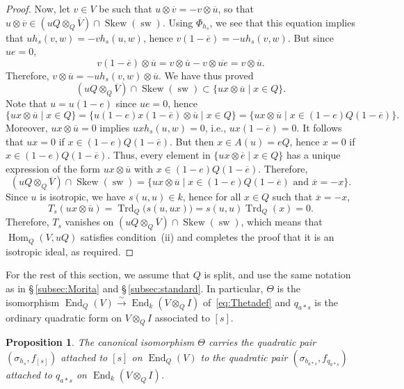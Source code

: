 \documentclass{amsart}
\DeclareMathOperator{\sw}{sw}
\DeclareMathOperator{\End}{End}
\DeclareMathOperator{\Hom}{Hom}
\DeclareMathOperator{\Trd}{Trd}
\DeclareMathOperator{\Skew}{Skew}
\newtheorem{prop}{Proposition}[section]
\theoremstyle{remark}
\begin{document}
\begin{proof}
Now, let $v\in V$ be such that $u\otimes\overline v=-v\otimes
\overline u$, so that $u\otimes \overline v\in (uQ\otimes_Q\overline V)\cap\Skew(\sw)$. 
Using $\Phi_{h_s}$, we see that this equation implies
that $uh_s(v,w) = -vh_s(u,w)$, hence $v(1-\overline e) =
-uh_s(v,w)$. But since $ue=0$,
\[
  v(1-\overline e)\otimes\overline u = v\otimes \overline u- v\otimes
  \overline{ue} = v\otimes\overline u.
\]
Therefore, $v\otimes \overline u=-u h_s(v,w)\otimes\overline u$. We
have thus proved
\[
  (uQ\otimes_Q \overline V)\cap \Skew(\sw) \subset \{ux\otimes
  \overline u\mid x\in Q\}.
\]
Note that $u=u(1-e)$ since $ue=0$, hence
\[
  \{ux\otimes \overline u\mid x\in
  Q\} = \{u(1-e)x(1-\overline e)\otimes \overline u \mid x\in Q\}
  = \{ux\otimes \overline u\mid x\in (1-e)Q(1-\overline e)\}.
\]
Moreover, $ux\otimes \overline u = 0$ implies $uxh_s(u,w)=0$, i.e.,
$ux(1-\overline e)=0$. It follows that $ux=0$ if $x\in
(1-e)Q(1-\overline e)$. But then $x\in A(u)=eQ$, hence $x=0$ if $x\in
(1-e)Q(1-\overline e)$. Thus, every element in $\{ux\otimes\overline
e\mid x\in Q\}$ has a unique expression of the form $ux\otimes \overline
u$ with $x\in (1-e)Q(1-\overline e)$. Therefore,
\[
  (uQ\otimes_Q\overline V)\cap \Skew(\sw) = \{ux\otimes \overline
  u\mid x\in 
  (1-e)Q(1-\overline e) \text{ and }\overline x=-x\}.
\]
Since $u$ is isotropic, we have $s(u,u)\in k$, hence for all $x\in Q$
such that $\overline x = -x$,
\[
  T_s(ux\otimes \overline u) = \Trd_Q\bigl(s(u,ux)) = s(u,u)
  \Trd_Q(x) =0.
\]
Therefore, $T_s$ vanishes on $(uQ\otimes_Q\overline V)\cap\Skew(\sw)$,
which means that $\Hom_Q(V,uQ)$ satisfies condition~(ii) and completes
the proof that it is an isotropic ideal, as required.
\end{proof}

For the rest of this section, we assume that $Q$ is split, and use the
same notation as in \S\,\ref{subsec:Morita} and
\S\,\ref{subsec:standard}.  
In particular, $\Theta$ is the isomorphism
$\End_Q(V)\xrightarrow{\sim} \End_k(V\otimes_QI)$
of~\eqref{eq:Thetadef} and $q_{a*s}$  is the ordinary quadratic form
on $V\otimes_QI$ associated to $[s]$.

\begin{prop}
  \label{prop:quadpairs}
  The canonical isomorphism $\Theta$ carries the quadratic pair
  $(\sigma_{h_s}, f_{[s]})$  attached to $[s]$ on $\End_Q(V)$ to the
  quadratic pair $(\sigma_{b_{a*s}},f_{q_{a*s}})$ attached to
  $q_{a*s}$ on $\End_k(V\otimes_QI)$.
\end{prop}
\end{document}
